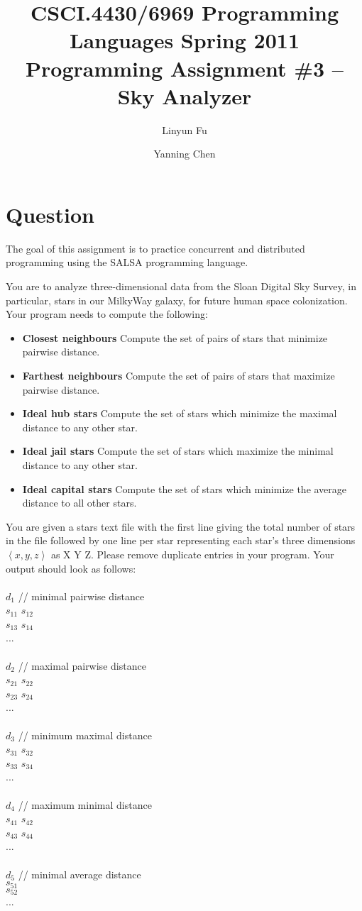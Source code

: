 \documentclass[12pt,letterpaper]{article}
\author{Linyun Fu\and Yanning Chen}
\title{CSCI.4430/6969 Programming Languages Spring 2011\\
Programming Assignment \#3 -- Sky Analyzer}
\begin{document}
\maketitle
\part*{Question}
The goal of this assignment is to practice concurrent and distributed programming using the SALSA programming language. 

You are to analyze three-dimensional data from the Sloan Digital Sky Survey, in particular, stars in our MilkyWay galaxy, for future human space colonization. Your program needs to compute the following: 
\begin{itemize}
\item \textbf{Closest neighbours} Compute the set of pairs of stars that minimize pairwise distance.
\item \textbf{Farthest neighbours} Compute the set of pairs of stars that maximize pairwise distance.
\item \textbf{Ideal hub stars} Compute the set of stars which minimize the maximal distance to any other star.
\item \textbf{Ideal jail stars} Compute the set of stars which maximize the minimal distance to any other star.
\item \textbf{Ideal capital stars} Compute the set of stars which minimize the average distance to all other stars. 
\end{itemize}

You are given a stars text file with the first line giving the total number of stars in the file followed by one line per star representing each star's three dimensions $\left<x,y,z\right>$ as X Y Z. Please remove duplicate entries in your program. Your output should look as follows:\\
\\
$d_1$  // minimal pairwise distance\\
$s_{11}$ $s_{12}$\\
$s_{13}$ $s_{14}$\\
...\\
\\
$d_2$  // maximal pairwise distance\\
$s_{21}$ $s_{22}$\\
$s_{23}$ $s_{24}$\\
...\\
\\
$d_3$ // minimum maximal distance\\
$s_{31}$ $s_{32}$\\
$s_{33}$ $s_{34}$\\
...\\
\\
$d_4$ // maximum minimal distance\\
$s_{41}$ $s_{42}$\\
$s_{43}$ $s_{44}$\\
... \\
\\
$d_5$ // minimal average distance\\
$s_{51}$\\
$s_{52}$\\
...\\
\end{document}
